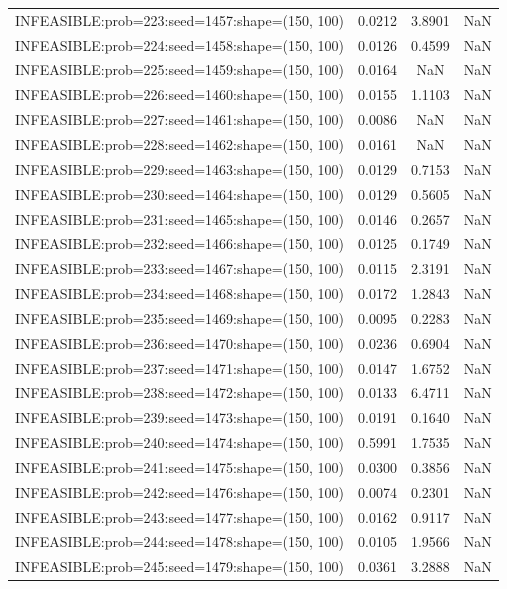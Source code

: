 \begin{longtable}{lccc}
INFEASIBLE:prob=223:seed=1457:shape=(150, 100) & 0.0212 &  3.8901 &    NaN \\
INFEASIBLE:prob=224:seed=1458:shape=(150, 100) & 0.0126 &  0.4599 &    NaN \\
INFEASIBLE:prob=225:seed=1459:shape=(150, 100) & 0.0164 &     NaN &    NaN \\
INFEASIBLE:prob=226:seed=1460:shape=(150, 100) & 0.0155 &  1.1103 &    NaN \\
INFEASIBLE:prob=227:seed=1461:shape=(150, 100) & 0.0086 &     NaN &    NaN \\
INFEASIBLE:prob=228:seed=1462:shape=(150, 100) & 0.0161 &     NaN &    NaN \\
INFEASIBLE:prob=229:seed=1463:shape=(150, 100) & 0.0129 &  0.7153 &    NaN \\
INFEASIBLE:prob=230:seed=1464:shape=(150, 100) & 0.0129 &  0.5605 &    NaN \\
INFEASIBLE:prob=231:seed=1465:shape=(150, 100) & 0.0146 &  0.2657 &    NaN \\
INFEASIBLE:prob=232:seed=1466:shape=(150, 100) & 0.0125 &  0.1749 &    NaN \\
INFEASIBLE:prob=233:seed=1467:shape=(150, 100) & 0.0115 &  2.3191 &    NaN \\
INFEASIBLE:prob=234:seed=1468:shape=(150, 100) & 0.0172 &  1.2843 &    NaN \\
INFEASIBLE:prob=235:seed=1469:shape=(150, 100) & 0.0095 &  0.2283 &    NaN \\
INFEASIBLE:prob=236:seed=1470:shape=(150, 100) & 0.0236 &  0.6904 &    NaN \\
INFEASIBLE:prob=237:seed=1471:shape=(150, 100) & 0.0147 &  1.6752 &    NaN \\
INFEASIBLE:prob=238:seed=1472:shape=(150, 100) & 0.0133 &  6.4711 &    NaN \\
INFEASIBLE:prob=239:seed=1473:shape=(150, 100) & 0.0191 &  0.1640 &    NaN \\
INFEASIBLE:prob=240:seed=1474:shape=(150, 100) & 0.5991 &  1.7535 &    NaN \\
INFEASIBLE:prob=241:seed=1475:shape=(150, 100) & 0.0300 &  0.3856 &    NaN \\
INFEASIBLE:prob=242:seed=1476:shape=(150, 100) & 0.0074 &  0.2301 &    NaN \\
INFEASIBLE:prob=243:seed=1477:shape=(150, 100) & 0.0162 &  0.9117 &    NaN \\
INFEASIBLE:prob=244:seed=1478:shape=(150, 100) & 0.0105 &  1.9566 &    NaN \\
INFEASIBLE:prob=245:seed=1479:shape=(150, 100) & 0.0361 &  3.2888 &    NaN \\

\end{longtable}
